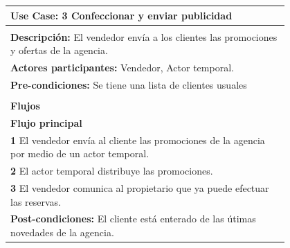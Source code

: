 \documentclass[12pt,a4paper,titlepage,oneside]{article}
\begin{document}
\begin{tabular}{| l | p{0.8\linewidth} |} \hline
	\multicolumn{2}{|p{0.8\linewidth}|}{\textbf{Use Case:} 3 Confeccionar y enviar publicidad} \\ \hline
	\multicolumn{2}{|c|}{} \\ \hline
	\multicolumn{2}{|p{0.8\linewidth}|}{\textbf{Descripci\'on:} El vendedor envía a los clientes las promociones y ofertas de la agencia.} \\ \hline
	\multicolumn{2}{|p{0.8\linewidth}|}{\textbf{Actores participantes:} Vendedor, Actor temporal.} \\ \hline
	\multicolumn{2}{|p{0.8\linewidth}|}{\textbf{Pre-condiciones:} Se tiene una lista de clientes usuales} \\ \hline
	\multicolumn{2}{|c|}{} \\ \hline
	\multicolumn{2}{|p{0.8\linewidth}|}{\textbf{Flujos}} \\ \hline
	\multicolumn{2}{|p{0.8\linewidth}|}{\textbf{Flujo principal}} \\ \hline
	\multicolumn{2}{|p{0.8\linewidth}|}{\textbf{1} El vendedor envía al cliente las promociones de la agencia por medio de un actor temporal.} \\ \hline
	\multicolumn{2}{|p{0.8\linewidth}|}{\textbf{2} El actor temporal distribuye las promociones.} \\ \hline
	\multicolumn{2}{|p{0.8\linewidth}|}{\textbf{3} El vendedor comunica al propietario que ya puede efectuar las reservas.}\\ \hline
	\multicolumn{2}{|p{0.8\linewidth}|}{\textbf{Post-condiciones:} El cliente está enterado de las útimas novedades de la agencia.}\\ \hline
\end{tabular} \\\\
\\\\\\\\
\end{document}
